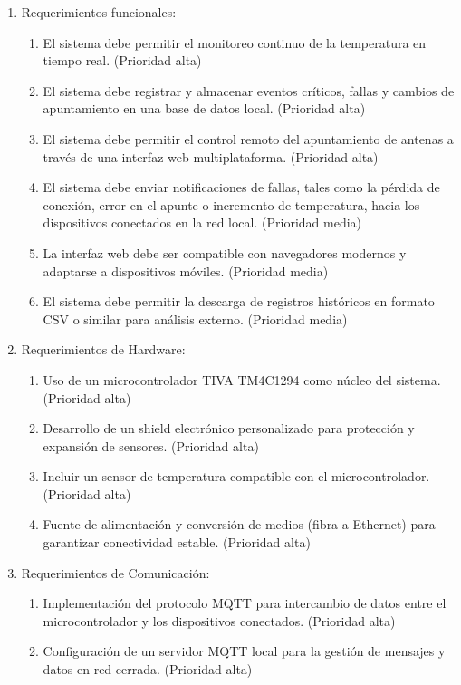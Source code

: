 \documentclass[
11pt, %
]{charter}
\begin{document}
\begin{enumerate}
	\item Requerimientos funcionales:
	\begin{enumerate}
		\item El sistema debe permitir el monitoreo continuo de la temperatura en tiempo real. (Prioridad alta)
		\item El sistema debe registrar y almacenar eventos críticos, fallas y cambios de apuntamiento en una base de datos local. (Prioridad alta)
		\item El sistema debe permitir el control remoto del apuntamiento de antenas a través de una interfaz web multiplataforma. (Prioridad alta)
		\item El sistema debe enviar notificaciones de fallas, tales como la pérdida de conexión, error en el apunte o incremento de temperatura, hacia los dispositivos conectados en la red local. (Prioridad media)
		\item La interfaz web debe ser compatible con navegadores modernos y adaptarse a dispositivos móviles. (Prioridad media)
		\item El sistema debe permitir la descarga de registros históricos en formato CSV o similar para análisis externo. (Prioridad media)
	\end{enumerate}
	\item Requerimientos de Hardware:
	\begin{enumerate}
		\item Uso de un microcontrolador TIVA TM4C1294 como núcleo del sistema. (Prioridad alta)
		\item Desarrollo de un shield electrónico personalizado para protección y expansión de sensores. (Prioridad alta)
		\item Incluir un sensor de temperatura compatible con el microcontrolador. (Prioridad alta)
		\item  Fuente de alimentación y conversión de medios (fibra a Ethernet) para garantizar conectividad estable. (Prioridad alta)
	\end{enumerate}
\newpage
	\item Requerimientos de Comunicación:
	\begin{enumerate}
		\item Implementación del protocolo MQTT para intercambio de datos entre el microcontrolador y los dispositivos conectados. (Prioridad alta)
		\item Configuración de un servidor MQTT local para la gestión de mensajes y datos en red cerrada. (Prioridad alta)

\end{enumerate}
\end{enumerate}
\end{document}
